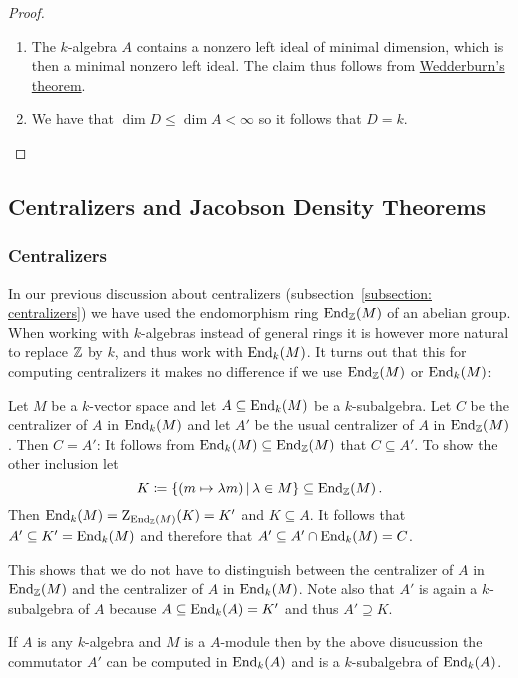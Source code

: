 \begin{proof}
  \leavevmode
  \begin{enumerate}
    \item
      The $k$-algebra $A$ contains a nonzero left ideal of minimal dimension, which is then a minimal nonzero left ideal.
      The claim thus follows from \hyperref[theorem: wedderburns theorem]{Wedderburn’s theorem}.
    \item
      We have that $\dim D \leq \dim A < \infty$ so it follows that $D = k$.
    \qedhere
  \end{enumerate}
\end{proof}





\subsection*{Centralizers and Jacobson Density Theorems}



\subsubsection{Centralizers}

\begin{fluff}
  In our previous discussion about centralizers (subsection~\ref{subsection: centralizers}) we have used the endomorphism ring $\operatorname{End}_{\mathbb{Z}}(M)$ of an abelian group.
  When working with $k$-algebras instead of general rings it is however more natural to replace $\mathbb{Z}$ by $k$, and thus work with $\operatorname{End}_k(M)$.
  It turns out that this for computing centralizers it makes no difference if we use $\operatorname{End}_{\mathbb{Z}}(M)$ or $\operatorname{End}_k(M)$:
  
  Let $M$ be a $k$-vector space and let $A \subseteq \operatorname{End}_k(M)$ be a $k$-subalgebra.
  Let $C$ be the centralizer of $A$ in $\operatorname{End}_k(M)$ and let $A'$ be the usual centralizer of $A$ in $\operatorname{End}_{\mathbb{Z}}(M)$.
  Then $C = A'$:
  It follows from $\operatorname{End}_k(M) \subseteq \operatorname{End}_{\mathbb{Z}}(M)$ that $C \subseteq A'$.
  To show the other inclusion let
  \[
              K
    \defined  \{ (m \mapsto \lambda m) \suchthat \lambda \in M \}
    \subseteq \End_\Integer(M) \,.
  \]
  Then $\operatorname{End}_k(M) = \operatorname{Z}_{\operatorname{End}_{\mathbb{Z}}(M)}(K) = K'$ and $K \subseteq A$.
  It follows that $A' \subseteq K' = \operatorname{End}_k(M)$ and therefore that $A' \subseteq A' \cap \operatorname{End}_k(M) = C$.
  
  This shows that we do not have to distinguish between the centralizer of $A$ in $\operatorname{End}_{\mathbb{Z}}(M)$ and the centralizer of $A$ in $\operatorname{End}_k(M)$.
  Note also that $A'$ is again a $k$-subalgebra of $A$ because $A \subseteq \operatorname{End}_k(A) = K'$ and thus $A' \supseteq K$.
  
  If $A$ is any $k$-algebra and $M$ is a $A$-module then by the above disucussion the commutator $A'$ can be computed in $\operatorname{End}_k(A)$ and is a $k$-subalgebra of $\operatorname{End}_k(A)$.
\end{fluff}





